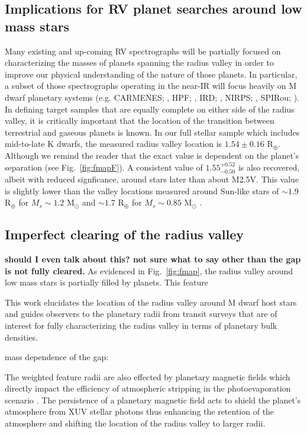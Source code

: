 \documentclass[twocolumn]{emulateapj}
\begin{document}
\subsection{Implications for RV planet searches around low mass stars}
Many existing and up-coming RV spectrographs
will be partially focused on characterizing the masses of planets spanning the radius valley in order to
improve our physical understanding of the nature of those planets. In particular, a subset of those spectrographs
operating in the near-IR will focus heavily on M dwarf planetary systems
(e.g. CARMENES; \citealt{quirrenbach14}, HPF; \citealt{mahadevan12}, IRD; \citealt{kotani14},
NIRPS; \citealt{bouchy17}, SPIRou; \citealt{donati18}). In defining target samples
that are equally complete on either side of the radius valley, it is critically important that the location
of the transition between terrestrial and gaseous planets is known. In our full stellar sample which includes
mid-to-late K dwarfs, the measured radius valley location is $1.54\pm 0.16$ R$_{\oplus}$. Although we remind the
reader that the exact value is dependent on the planet's separation (see Fig.~\ref{fig:fmapF}). A consistent value of
$1.55^{+0.52}_{-0.50}$ is also recovered, albeit with reduced signficance, around stars later than about M2.5V.
This value is slightly lower than the valley locations measured around Sun-like stars of
$\sim 1.9$ R$_{\oplus}$ for $M_s \sim 1.2$ M$_{\odot}$ and $\sim 1.7$ R$_{\oplus}$ for $M_s \sim 0.85$ M$_{\odot}$
\citep{fulton18}.

\subsection{Imperfect clearing of the radius valley} \label{sect:void}
\textbf{should I even talk about this? not sure what to say other than the gap is not fully cleared.}
As evidenced in Fig.~\ref{fig:fmap}, the radius valley around low mass stars is partially filled by planets.
This feature 

This work elucidates the location of
the radius valley around M dwarf host stars and guides observers to the planetary radii from transit surveys
that are of interest for fully characterizing the radius valley in terms of planetary bulk densities.

mass dependence of the gap: 

The weighted feature radii are also effected by planetary magnetic fields which directly impact the 
efficiency of atmospheric stripping in the photoevaporation scenario \citep{owen19}. The persistence 
of a planetary magnetic field acts to shield the planet's atmosphere from XUV stellar photons thus 
enhancing the retention of the atmosphere and shifting the location of the radius valley to larger 
radii.
\end{document}
